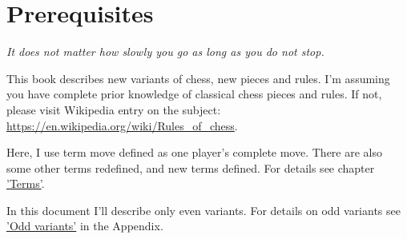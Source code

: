 
\chapter*{Prerequisites}

\begin{flushright}
\parbox{0.7\textwidth}{
\emph{It does not matter how slowly you go as long as you do not stop. \\
 } }
\end{flushright}

\noindent
This book describes new variants of chess, new pieces and rules. I'm assuming you have complete prior
knowledge of classical chess pieces and rules. If not, please visit Wikipedia entry on the subject: \\
\href{https://en.wikipedia.org/wiki/Rules\_of\_chess}{https://en.wikipedia.org/wiki/Rules\_of\_chess}.

Here, I use term move defined as one player's complete move. There are also some other terms redefined,
and new terms defined. For details see chapter \hyperref[ch:Terms]{'Terms'}.

In this document I'll describe only even variants. For details on odd variants see
\hyperref[sec:Appendix/Odd variants]{'Odd variants'} in the Appendix.

\clearpage %
